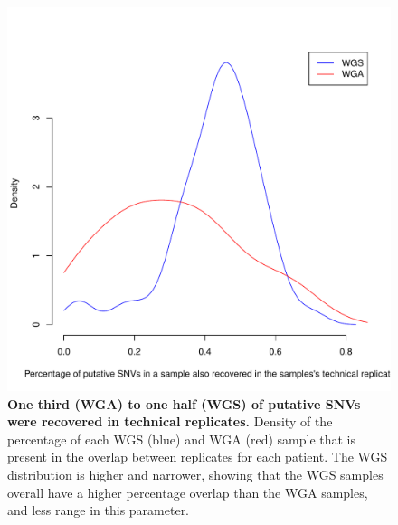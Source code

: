 \documentclass[11 pt]{article} %
\begin{document}
\begin{figure}
\centerline{
\includegraphics[width=5in]{Figure3.pdf} }
\caption{\textbf{One third (WGA) to one half (WGS) of putative SNVs were recovered in technical replicates.} Density of the percentage of each WGS (blue) and WGA (red) sample that is present in the overlap between replicates for each patient. The WGS distribution is higher and narrower, showing that the WGS samples overall have a higher percentage overlap than the WGA samples, and less range in this parameter. }
\label{fig:unfiltered_overlap}
\end{figure}
\end{document}
